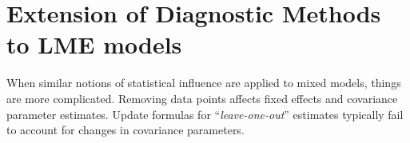 \documentclass[12pt, a4paper]{report}
\theoremstyle{plain}
\theoremstyle{definition}
\theoremstyle{remark}
\begin{document}
%
%
%
%
%
%
%
%
%
%
%

\section{Extension of Diagnostic Methods to LME models}


When similar notions of statistical influence are applied to mixed models,
things are more complicated. Removing data points affects fixed effects and covariance parameter estimates.
Update formulas for “\textit{leave-one-out}” estimates typically fail to account for changes in covariance
parameters. 
%
%
\end{document}
